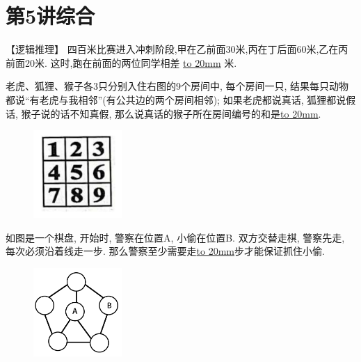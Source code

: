 \section{第5讲\quad 综合}

\item {
    【逻辑推理】
    四百米比赛进入冲刺阶段,甲在乙前面30米,丙在丁后面60米,乙在丙前面20米. 这时,跑在前面的两位同学相差 \underline{\hbox to 20mm{}} 米.
    \vspace{1cm}
}

\item {
    老虎、狐狸、猴子各3只分别入住右图的9个房间中, 每个房间一只, 结果每只动物都说``有老虎与我相邻''(有公共边的两个房间相邻); 如果老虎都说真话, 狐狸都说假话, 猴子说的话不知真假, 那么说真话的猴子所在房间编号的和是\underline{\hbox to 20mm{}}.
    \begin{figure}[H] 
        \centering
        \includegraphics[width=0.3\textwidth]{./pics/Chapter_5/4.png}
    \end{figure}
    \vspace{1cm}
}

\item {
    如图是一个棋盘, 开始时, 警察在位置A, 小偷在位置B. 双方交替走棋, 警察先走, 每次必须沿着线走一步. 那么警察至少需要走\underline{\hbox to 20mm{}}步才能保证抓住小偷.
    \begin{figure}[H] 
        \centering
        \includegraphics[width=0.3\textwidth]{./pics/Chapter_5/2015_1.png}
    \end{figure}
    \vspace{1cm}
}

